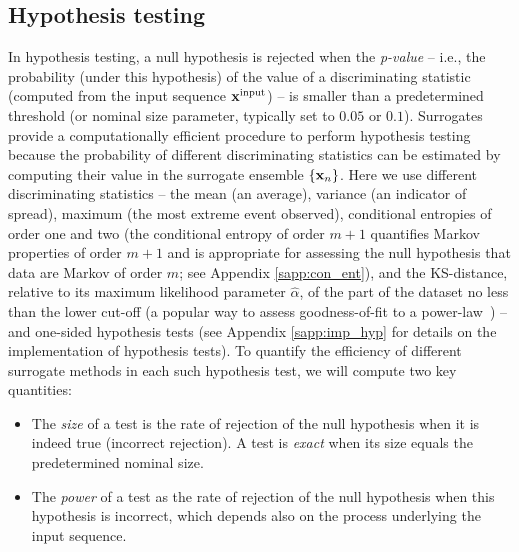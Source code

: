 \documentclass[%
prx,
reprint,
superscriptaddress,
nofootinbib,
 amsmath,amssymb,
 aps,
floatfix,
]{revtex4-2}
\newcommand{\xin}{{{\bf x}^{\text{input}}}}
\begin{document}
\subsection{Hypothesis testing}

In hypothesis testing, a null hypothesis is rejected when the \emph{p-value} -- i.e., the probability (under this hypothesis) of the value of a discriminating statistic (computed from the input sequence $\xin$) -- is smaller than a predetermined threshold (or nominal size parameter, typically set to $0.05$ or $0.1$). Surrogates provide a computationally efficient procedure to perform hypothesis testing because the probability of different discriminating statistics can be estimated by computing their value in the surrogate ensemble $\{{\bf x}_n\}$.
%
Here we use different discriminating statistics -- the mean (an average), variance (an indicator of spread), maximum (the most extreme event observed), conditional entropies of order one and two (the conditional entropy of order $m + 1$ quantifies Markov properties of order $m + 1$ and is appropriate for assessing the null hypothesis that data are Markov of order $m$; see Appendix \ref{sapp:con_ent}), and the KS-distance, relative to its maximum likelihood parameter $\hat{\alpha}$, of the part of the dataset {no less than} the lower cut-off (a popular way to assess goodness-of-fit to a power-law~\cite{clauset2009power}) -- and one-sided hypothesis tests 
{(see Appendix \ref{sapp:imp_hyp} for details on the implementation of hypothesis tests)}.
%
To quantify the efficiency of different surrogate methods in each such hypothesis test, we will compute two key quantities:

\begin{itemize}
    \item The \emph{size} of a test is the rate of rejection of the null hypothesis when it is indeed true (incorrect rejection). 
    A test is \emph{exact} when its size equals the predetermined nominal size. 
    \item The \emph{power} of a test as the rate of rejection of the null hypothesis when this hypothesis is incorrect, which depends also on the process underlying the input sequence.
\end{itemize}
\end{document}
